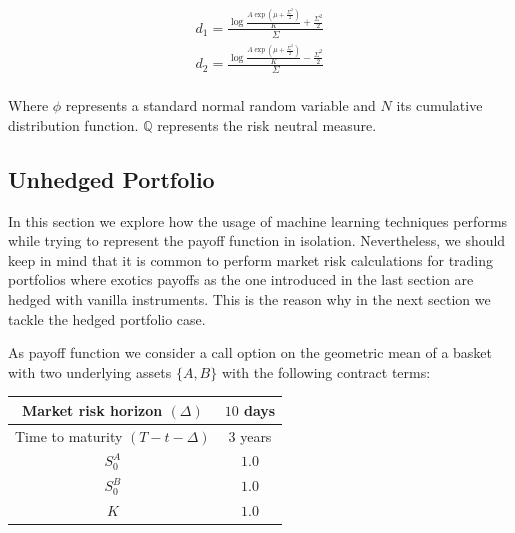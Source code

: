 $$
\begin{aligned}
d_1 = \frac{\log\frac{A\exp\left(\mu+\frac{\Sigma^2}{2}\right)}{K}+\frac{\Sigma^2}{2}}{\Sigma} \\
d_2 = \frac{\log\frac{A\exp\left(\mu+\frac{\Sigma^2}{2}\right)}{K}-\frac{\Sigma^2}{2}}{\Sigma} \\
\end{aligned}
$$



Where $\phi$ represents a standard normal random variable and $N$ its cumulative distribution function. $\mathbb{Q}$ represents the risk neutral measure.


\subsection{Unhedged Portfolio}
 In this section we explore how the usage of machine learning techniques performs while trying to represent the payoff function in isolation. Nevertheless, we should keep in mind that it is common to perform market risk calculations for trading portfolios where exotics payoffs as the one introduced in the last section are hedged with vanilla instruments. This is the reason why in the next section we tackle the hedged portfolio case. 
 
 As payoff function we consider a call option on the geometric mean of a basket with two underlying assets $\{A,B\}$ with the following contract terms:
 
 
 
 
\begin{center}
\begin{tabular}{||c | c||} 
 \hline
 Market risk horizon $(\Delta)$ & $10$ days \\ 
 \hline
 Time to maturity $(T-t-\Delta)$ & $3$ years \\
 \hline
 $S_0^A$ & $1.0$ \\
 \hline
 $S_0^B$ & $1.0$ \\
 \hline
 $K$ & $1.0$ \\
 \hline
 \end{tabular}
\end{center}


